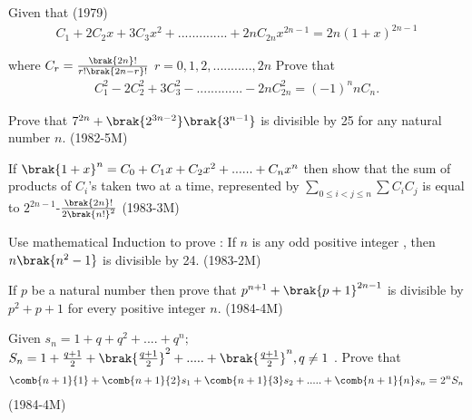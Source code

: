  \iffalse
\title{Assignment}
\author{Golla Shriram - AI24BTech11010}
\section{subjective}
\fi                                                                      
    
		
 \item Given that  \hfill{(1979)} 
			  \begin{align*}
C_1 + 2C_2x + 3C_3x^2 + .............. + 2nC_{2n}x^{2n-1}   =    2n(1+x)^{2n-1} 
			  \end{align*}
		
		where $C_r =\frac{\brak{2n}!}{r!\brak{2n-r}!}$ $r=0,1,2,...........,2n$     Prove that  \begin{align*} 
		     C^2_1-2C_2^2+3C_3^2-.............-2nC_{2n}^2  = (-1)^nnC_n. 
		     \end{align*}          
 \item Prove that $ 7^{2n} + \brak{2^{3n-2}}  \brak{3^{n-1}} $ is divisible by 25 for any natural number $ n$. \hfill{(1982-5M)}  
\item If $ \brak{1+x}^n= C_0 + C_1x +C_2x^2+......+C_nx^n $ then show that the sum of products of $ C_i $'s taken
		   two at a time, represented by $ \sum\limits_{0 \leq i<j \leq n}^{}\sum C_i C_j $ is equal to $ 2^{2n-1}$-$\frac{\brak{2n}!} {2\brak{n!}^2} $ \hfill{(1983-3M)}
 \item Use mathematical Induction to prove : If $n$ is any odd positive integer , then  $ n\brak{n^2-1} $ is divisible by 24.
		   \hfill{(1983-2M)}
 \item If $ p $ be a natural number then prove that $ p^{n+1}+\brak{p+1}^{2n-1} $ is divisible by $ p^2+p+1 $ for every positive integer $n$. \hfill{(1984-4M)} 
 \item Given  $ s_n = 1 + q + q^2 +....+q^n;$
		    $ S_n = 1 + \frac{q+1}{2}+\brak{\frac{q+1}{2}}^2+.....+\brak{\frac{q+1}{2}}^n,q\neq1 $ . Prove that
		     \begin{align*} 
			    \comb{n+1}{1}+\comb{n+1}{2}s_1+\comb{n+1}{3}s_2+.....+\comb{n+1}{n}s_n=2^nS_n
		    \end{align*}    \hfill{(1984-4M)}

